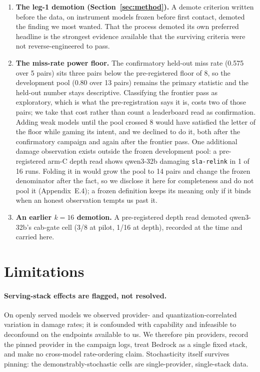 \documentclass{article}
\begin{document}
\begin{enumerate}
\item \textbf{The leg-1 demotion (Section~\ref{sec:method}).} A demote criterion
written before the data, on instrument models frozen before first contact,
demoted the finding we most wanted. That the process demoted its own preferred
headline is the strongest evidence available that the surviving criteria were not
reverse-engineered to pass.
\item \textbf{The miss-rate power floor.} The confirmatory held-out miss rate
(0.575 over 5
pairs) sits three pairs below the pre-registered floor of 8, so the development
pool
(0.80 over 13 pairs) remains the primary statistic and the held-out number stays
descriptive. Classifying the frontier pass as exploratory, which is what the
pre-registration says it is, costs two of those pairs; we take that cost rather
than count a leaderboard read as confirmation. Adding weak models until the pool
crossed 8 would have satisfied the
letter of the floor while gaming its intent, and we declined to do it, both after
the confirmatory campaign and again after the frontier pass. One additional
damage observation exists outside the frozen development pool: a pre-registered
arm-C depth read shows qwen3-32b damaging \texttt{sla-relink} in 1 of 16 runs.
Folding it in would grow the pool to 14 pairs and change the frozen denominator
after the fact, so we disclose it here for completeness and do not pool it
(Appendix~E.4); a frozen definition keeps its meaning only if it binds when an
honest observation tempts us past it.
\item \textbf{An earlier $k=16$ demotion.} A pre-registered depth read demoted
qwen3-32b's cab-gate cell (3/8 at pilot, 1/16 at depth), recorded at the time and
carried here.
\end{enumerate}

\section{Limitations}
\label{sec:limits}

\paragraph{Serving-stack effects are flagged, not resolved.} On openly served
models we observed provider- and quantization-correlated variation in damage
rates; it is confounded with capability and infeasible to deconfound on the
endpoints available to us. We therefore pin providers, record the pinned
provider in the campaign logs,
treat Bedrock as a single fixed stack, and make no cross-model rate-ordering
claim. Stochasticity itself survives pinning: the demonstrably-stochastic cells
are single-provider, single-stack data.
\end{document}
